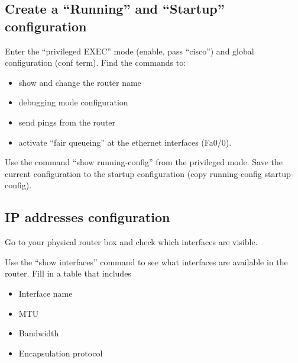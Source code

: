 \subsection{Create a ``Running'' and ``Startup'' configuration}
Enter the ``privileged EXEC'' mode (enable, pass ``cisco'') and global configuration (conf term). 
Find the commands to:
\begin{itemize}
\item show and change the router name
\item debugging mode configuration
\item send pings from the router
\item activate ``fair queueing'' at the ethernet interfaces (Fa0/0).
\end{itemize}

Use the command ``show running-config'' from the privileged mode.
Save the current configuration to the startup configuration (copy running-config startup-config).

\subsection{IP addresses configuration}
Go to your physical router box and check which interfaces are visible.

Use the ``show interfaces'' command to see what interfaces are available in the router.
Fill in a table that includes
\begin{itemize}
\item Interface name
\item MTU
\item Bandwidth
\item Encapsulation protocol
\end{itemize}
